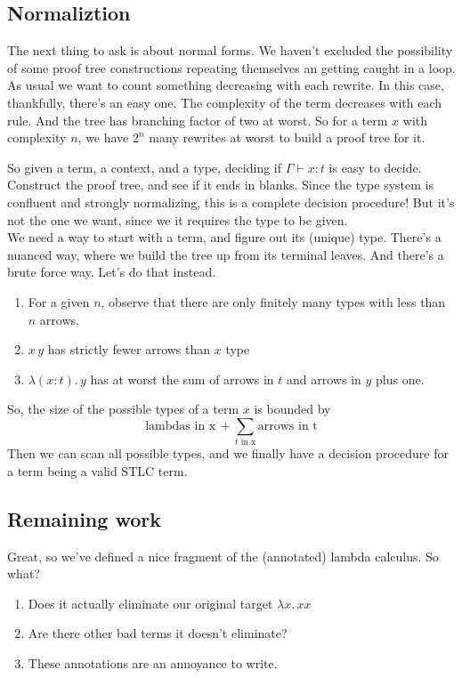\documentclass[12pt]{article}
\begin{document}
\subsection{Normaliztion}
The next thing to ask is about normal forms.
We haven't excluded the possibility of some proof tree constructions repeating themselves an getting caught in a loop.
As usual we want to count something decreasing with each rewrite.
In this case, thankfully, there's an easy one.
The complexity of the term decreases with each rule.
And the tree has branching factor of two at worst.
So for a term $x$ with complexity $n$, we have $2^n$ many rewrites at worst to build a proof tree for it.

So given a term, a context, and a type, deciding if $\Gamma \vdash x : t$ is easy to decide.
Construct the proof tree, and see if it ends in blanks.
Since the type system is confluent and strongly normalizing, this is a complete decision procedure!
But it's not the one we want, since we it requires the type to be given.
\\\newline
We need a way to start with a term, and figure out its (unique) type.
There's a nuanced way, where we build the tree up from its terminal leaves.
And there's a brute force way. Let's do that instead.
\begin{enumerate}
    \item For a given $n$, observe that there are only finitely many types with less than $n$ arrows.
    \item  $x\, y$ has strictly fewer arrows than $x$ type
    \item  $\lambda (x:t).\, y$ has at worst the sum of arrows in $t$ and arrows in $y$ plus one.

\end{enumerate}
So, the size of the possible types of a term $x$ is bounded by 
\[
  \text{lambdas in x} \, + \sum_{t \text{ in x}} \text{arrows in t}
\]
Then we can scan all possible types, and we finally have a decision procedure for a term being a valid STLC term.

\subsection{Remaining work}
Great, so we've defined a nice fragment of the (annotated) lambda calculus.
So what?
\begin{enumerate}
    \item Does it actually eliminate our original target $\lambda x.\,xx$
    \item Are there other bad terms it doesn't eliminate?
    \item These annotations are an annoyance to write.
\end{enumerate}
\end{document}
